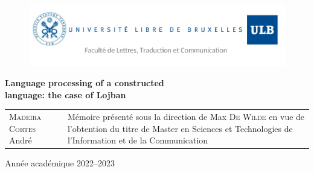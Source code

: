

\usepackage[
    backend=bibtex, style=authortitle, defernumbers=true, backref=true, block=none, hyperref=true
]{biblatex}



\setlength{}



\begin{titlingpage}

\begin{figure}[H]
\vspace{-2cm}
\hspace{-2.5cm}
\includegraphics[scale=0.30]{images/header.png}
\end{figure}

\vfill

\begin{center}
\hspace{-0.5cm}
\Huge{\textbf{Language processing of a constructed \\language: the case of Lojban}}\\
\end{center}

\vfill

\begin{tabular}{b{6.5cm}b{7.5cm}}
\textsc{Madeira Cortes} André & Mémoire présenté sous la direction de Max \textsc{De Wilde}
en vue de l'obtention du titre de Master en Sciences et Technologies de l'Information et de la Communication\\
\end{tabular}

\vfill

\begin{center}
\Large Année académique 2022--2023
\end{center}

\end{titlingpage}

\pagestyle{empty}
\newpage \ \newpage %

